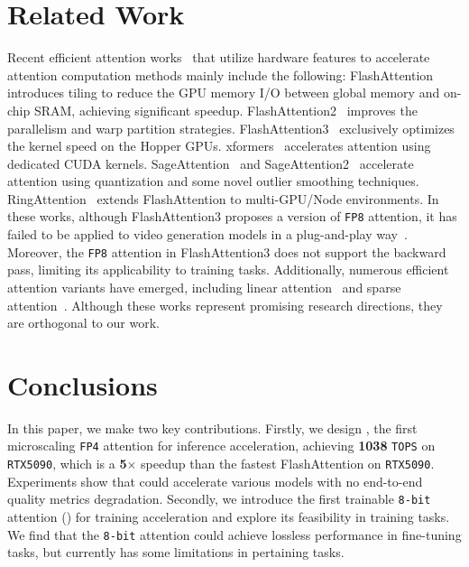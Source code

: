 


\section{Related Work}
Recent efficient attention works~\citep{zhangsurvey} that utilize hardware features to accelerate attention computation methods mainly include the following: FlashAttention~\citep{dao2022flashattention} introduces tiling to reduce the GPU memory I/O between global memory and on-chip SRAM, achieving significant speedup. FlashAttention2~\citep{dao2023flashattention} improves the parallelism and warp partition strategies. FlashAttention3~\citep{shah2024flashattention} exclusively optimizes the kernel speed on the Hopper GPUs. xformers~\citep{xFormers2022} accelerates attention using dedicated CUDA kernels. SageAttention~\citep{2024sageattention} and SageAttention2~\citep{zhang2024sageattention2,zhang2025sageattention2++} accelerate attention using quantization and some novel outlier smoothing techniques. 
RingAttention~\citep{liuringattention} extends FlashAttention to multi-GPU/Node environments. In these works, although FlashAttention3 proposes a version of \texttt{FP8} attention, it has failed to be applied to video generation models in a plug-and-play way~\citep{zhang2024sageattention2}. Moreover, the \texttt{FP8} attention in FlashAttention3 does not support the backward pass, limiting its applicability to training tasks. Additionally, numerous efficient attention variants have emerged, including linear attention~\citep{wang2020linformer,choromanski2020rethinking,yu2022metaformer,katharopoulos2020transformers,qin2024lightning,yang2024gated} and sparse attention~\citep{zhang2025spargeattn,zhang2025sla,xi2025sparse,yang2025sparse,liu2021swin,chu2021twins,xiao2023efficient,xiao2024infllm,chen2023longlora,jiang2024minference,venkataramanan2023skip,gao2024seerattention,moaattention}. Although these works represent promising research directions, they are orthogonal to our work.



\section{Conclusions}
In this paper, we make two key contributions. Firstly, we design \our, the first microscaling \texttt{FP4} attention for inference acceleration, achieving \textbf{1038} \texttt{TOPS} on \texttt{RTX5090}, which is a \textbf{5}$\times$ speedup than the fastest FlashAttention on \texttt{RTX5090}. Experiments show that \our could accelerate various models with no end-to-end quality metrics degradation.
Secondly, we introduce the first trainable \texttt{8-bit} attention (\sageback) for training acceleration and explore its feasibility in training tasks. We find that the \texttt{8-bit} attention could achieve lossless performance in fine-tuning tasks, but currently has some limitations in pertaining tasks.


